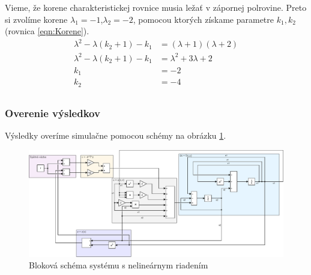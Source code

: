 \documentclass[../main.tex]{subfiles}
\begin{document}
Vieme, že korene charakteristickej rovnice musia ležať v zápornej polrovine. Preto si zvolíme korene $\lambda_1 = -1$,$\lambda_2 = -2$, pomocou ktorých získame parametre $k_1,k_2$ (rovnica \ref{eqn:Korene}).
\begin{equation}
\begin{aligned} 
\lambda^2 - \lambda(k_2+1) - k_1 & = (\lambda + 1)(\lambda + 2)\\ 
\lambda^2 - \lambda(k_2+1) - k_1 & = \lambda^2 + 3\lambda + 2\\ 
k_1 &= -2\\
k_2 &= -4\\
\end{aligned}
\label{eqn:Korene}
\end{equation}

\subsubsection{Overenie výsledkov}
Výsledky overíme simulačne pomocou schémy na obrázku \ref{fig:PrikladsRiadenim}.
\newpage
\begin{figure}[H]
	\begin{center}\includegraphics[scale=0.8,angle=90]{Rovnica1MVS.pdf}\end{center}
	\caption{Bloková schéma systému s nelineárnym riadením}
	\label{fig:PrikladsRiadenim}
\end{figure}
\end{document}
